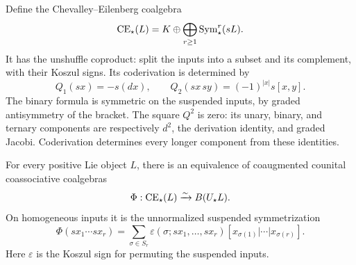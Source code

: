 Define\label{ogd:def:chevalley-coalgebra} the Chevalley--Eilenberg coalgebra
\[
 \operatorname{CE}_\star(L)=K\oplus\bigoplus_{r\geq1}\operatorname{Sym}^r_\star(sL).
\]
It has the unshuffle coproduct: split the inputs into a subset and its complement, with their Koszul signs.
Its coderivation is determined by
\[
 Q_1(sx)=-s(dx),\qquad Q_2(sx\,sy)=(-1)^{|x|}s[x,y].
\]
The binary formula is symmetric on the suspended inputs, by graded antisymmetry of the bracket.
The square \(Q^2\) is zero: its unary, binary, and ternary components are respectively \(d^2\), the derivation identity, and graded Jacobi.
Coderivation determines every longer component from these identities.

\begin{theorem}\label{ogd:thm:CE}
For every positive Lie object \(L\), there is an equivalence of coaugmented counital coassociative coalgebras
\begin{equation}\label{ogd:eq:CE-compare}
 \Phi:\operatorname{CE}_\star(L)\xrightarrow{\sim}B(U_\star L).
\end{equation}
On homogeneous inputs it is the unnormalized suspended symmetrization
\begin{equation}\label{ogd:eq:CE-map}
 \Phi(sx_1\cdots sx_r)=\sum_{\sigma\in S_r}
 \varepsilon(\sigma;sx_1,\ldots,sx_r)
          [x_{\sigma(1)}|\cdots|x_{\sigma(r)}].
\end{equation}
Here \(\varepsilon\) is the Koszul sign for permuting the suspended inputs.
\end{theorem}
